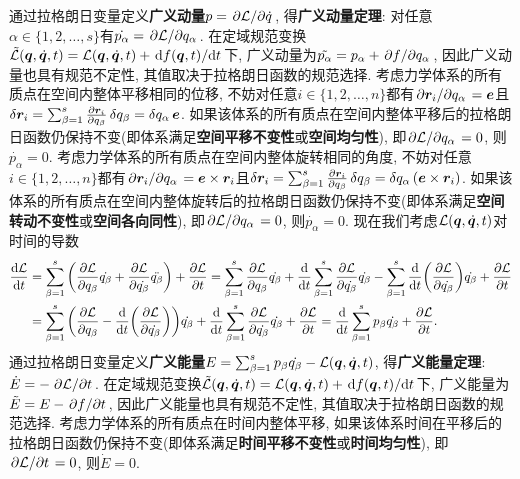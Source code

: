 通过拉格朗日变量定义\textbf{广义动量}$ p=\pdv*{\mathcal{L}}{\dot{q}} $, 得\textbf{广义动量定理}: 对任意$ \alpha \in \{1,2,\ldots,s\} $有$ \dot{p_{\alpha}}=\pdv*{\mathcal{L}}{q_{\alpha}} $. 在定域规范变换$ \tilde{\mathcal{L}}(\vb*{q},\dot{\vb*{q}},t)=\mathcal{L}(\vb*{q},\dot{\vb*{q}},t)+\dv*{f(\vb*{q},t)}{t} $下, 广义动量为$ \tilde{p_{\alpha}}=p_{\alpha}+\pdv*{f}{q_{\alpha}} $, 因此广义动量也具有规范不定性, 其值取决于拉格朗日函数的规范选择. 考虑力学体系的所有质点在空间内整体平移相同的位移, 不妨对任意$ i \in \{1,2,\ldots,n\} $都有$ \pdv*{\vb*{r}_i}{q_{\alpha}}=\vb*{e} $且$ \var{\vb*{r}_i} = \sum_{\beta=1}^s \pdv{\vb*{r}_i}{q_{\beta}} \var{q_{\beta}} = \var{q_{\alpha}} \vb*{e} $. 如果该体系的所有质点在空间内整体平移后的拉格朗日函数仍保持不变(即体系满足\textbf{空间平移不变性}或\textbf{空间均匀性}), 即$ \pdv*{\mathcal{L}}{q_{\alpha}}=0 $, 则$ \dot{p_{\alpha}}=0 $. 考虑力学体系的所有质点在空间内整体旋转相同的角度, 不妨对任意$ i \in \{1,2,\ldots,n\} $都有$ \pdv*{\vb*{r}_i}{q_{\alpha}}=\vb*{e} \times \vb*{r}_i $且$ \var{\vb*{r}_i} = \sum_{\beta=1}^s \pdv{\vb*{r}_i}{q_{\beta}} \var{q_{\beta}} = \var{q_{\alpha}} (\vb*{e} \times \vb*{r}_i) $. 如果该体系的所有质点在空间内整体旋转后的拉格朗日函数仍保持不变(即体系满足\textbf{空间转动不变性}或\textbf{空间各向同性}), 即$ \pdv*{\mathcal{L}}{q_{\alpha}}=0 $, 则$ \dot{p_{\alpha}}=0 $. 现在我们考虑$ \mathcal{L}(\vb*{q},\dot{\vb*{q}},t) $对时间的导数
\begin{align*}
    \dv{\mathcal{L}}{t} &= \sum_{\beta=1}^s \bigg(\pdv{\mathcal{L}}{q_{\beta}}\dot{q_{\beta}} + \pdv{\mathcal{L}}{\dot{q_{\beta}}} \ddot{q_{\beta}} \bigg) + \pdv{\mathcal{L}}{t} = \sum_{\beta=1}^s \pdv{\mathcal{L}}{q_{\beta}}\dot{q_{\beta}} + \dv{t} \sum_{\beta=1}^s \pdv{\mathcal{L}}{\dot{q_{\beta}}} \dot{q_{\beta}} - \sum_{\beta=1}^s \dv{t}(\pdv{\mathcal{L}}{\dot{q_{\beta}}}) \dot{q_{\beta}} + \pdv{\mathcal{L}}{t} \\
    &=\sum_{\beta=1}^s \bigg(\pdv{\mathcal{L}}{q_{\beta}} - \dv{t}(\pdv{\mathcal{L}}{\dot{q_{\beta}}}) \bigg)\dot{q_{\beta}} + \dv{t} \sum_{\beta=1}^s \pdv{\mathcal{L}}{\dot{q_{\beta}}} \dot{q_{\beta}} + \pdv{\mathcal{L}}{t} = \dv{t} \sum_{\beta=1}^s p_{\beta} \dot{q_{\beta}} + \pdv{\mathcal{L}}{t}.
\end{align*}
通过拉格朗日变量定义\textbf{广义能量}$ E=\sum_{\beta=1}^s p_{\beta}\dot{q_{\beta}} - \mathcal{L}(\vb*{q},\dot{\vb*{q}},t) $, 得\textbf{广义能量定理}: $ \dot{E}=-\pdv*{\mathcal{L}}{t} $. 在定域规范变换$ \tilde{\mathcal{L}}(\vb*{q},\dot{\vb*{q}},t)=\mathcal{L}(\vb*{q},\dot{\vb*{q}},t)+\dv*{f(\vb*{q},t)}{t} $下, 广义能量为$ \tilde{E}=E-\pdv*{f}{t} $, 因此广义能量也具有规范不定性, 其值取决于拉格朗日函数的规范选择. 考虑力学体系的所有质点在时间内整体平移, 如果该体系时间在平移后的拉格朗日函数仍保持不变(即体系满足\textbf{时间平移不变性}或\textbf{时间均匀性}), 即$ \pdv*{\mathcal{L}}{t}=0 $, 则$ \dot{E}=0 $.


